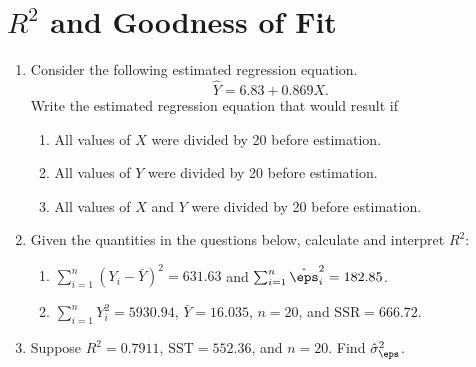 \documentclass[10pt]{article}
\begin{document}
\section*{\(R^2\) and Goodness of Fit}%
\begin{enumerate}
	\item Consider the following estimated regression equation.
	\[
	    \widehat Y = 6.83 + 0.869 X 
	.\]
	Write the estimated regression equation that would result if
	\begin{enumerate}
		\item All values of \(X\) were divided by 20 before estimation.
		\item All values of \(Y\) were divided by 20 before estimation. 
		\item All values of \(X\) and  \(Y\) were divided by 20 before estimation.
	\end{enumerate}
	\item Given the quantities in the questions below, calculate and interpret \(R^2\):
	 \begin{enumerate}
		 \item \( \sum_{i=1}^n (Y_i - \bar Y)^2 = 631.63\) and \( \sum_{i=1}^n \hat\eps_i^2 = 182.85\).
		 \item \( \sum_{i=1}^n Y_i^2 = 5930.94\), \(\bar Y = 16.035\),  \(n = 20\), and  \(\text{SSR} = 666.72\).
	\end{enumerate}
	\item Suppose \(R^2 = 0.7911\),  \(\text{SST}=552.36\), and \(n=20\). Find \(\hat\sigma_\eps^2\).
\end{enumerate}
\end{document}
